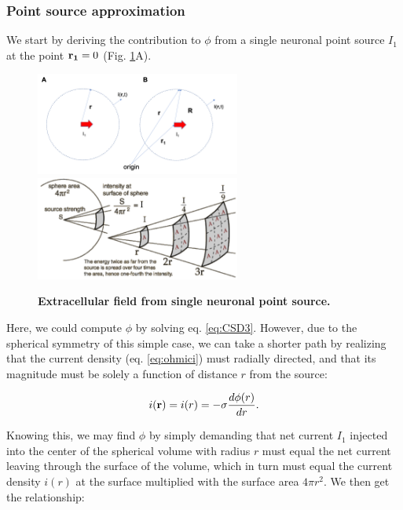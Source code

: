 \subsubsection{Point source approximation}
We start by deriving the contribution to $\phi$ from a single neuronal point source $I_1$ at the point ${\bf r_1}=0$ (Fig. \ref{fig:pointsource}A). 

\begin{figure}[!ht]
\begin{center}
\includegraphics[width=0.6\textwidth]{Figures/Pointsource.png}
\includegraphics[width=0.6\textwidth]{Figures/pointsource_3D_illustration.png}
\end{center}
\caption{\textbf{Extracellular field from single neuronal point source.} 
}
\label{fig:pointsource}
\end{figure}

Here, we could compute $\phi$ by solving eq. \ref{eq:CSD3}. However, due to the spherical symmetry of this simple case, we can take a shorter path by realizing that the current density (eq. \ref{eq:ohmici}) must radially directed, and that its magnitude must be solely a function of distance $r$ from the source:

\begin{equation}
i({\bf r}) = i(r) = -\sigma \frac{d\phi(r)}{dr}.
\end{equation}

Knowing this, we may find $\phi$ by simply demanding that net current $I_1$ injected into the center of the spherical volume with radius $r$ must equal the net current leaving through the surface of the volume, which in turn must equal the current density $i(r)$ at the surface multiplied with the surface area $4\pi r^2$. We then get the relationship:

